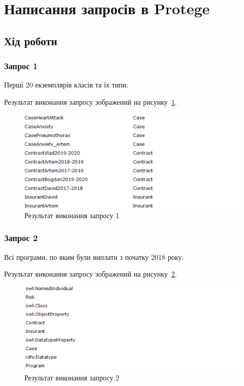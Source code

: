 



\newcommand{\labnumber}{3} %



\graphicspath{{figures/}}


\Ukrainian


\addtocounter{page}{1}

\section*{Написання запросів в Protege}

\subsection*{Хід роботи}
\subsubsection*{Запрос 1}
Перші 20 екземплярів класів та їх типи:
 

Результат виконання запросу зображений на рисунку~\ref{fig:sparql_1}.

\begin{figure}[H]
	\centering
	    \includegraphics{sparql_1}
	\caption{Результат виконання запросу 1}
	\label{fig:sparql_1}
\end{figure}

\subsubsection*{Запрос 2}
Всі програми, по яким були виплати з початку 2018 року:
 

Результат виконання запросу зображений на рисунку~\ref{fig:sparql_2}.

\begin{figure}[H]
	\centering
	    \includegraphics{sparql_2}
	\caption{Результат виконання запросу 2}
	\label{fig:sparql_2}
\end{figure}

